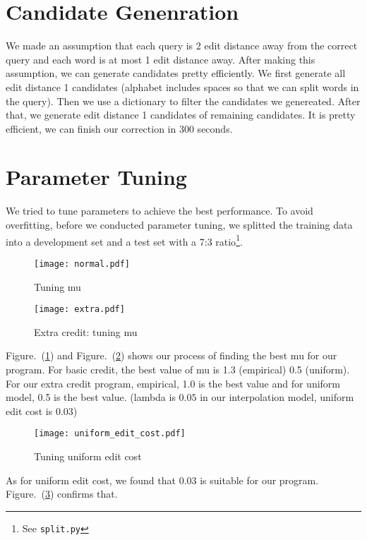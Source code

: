 \documentclass{article}
\begin{document}
\section{Candidate Genenration}

We made an assumption that each query is 2 edit distance away from the correct query and each word is at most 1 edit distance away. After making this assumption, we can generate candidates pretty efficiently. We first generate all edit distance 1 candidates (alphabet includes spaces so that we can split words in the query). Then we use a dictionary to filter the candidates we genereated. After that, we generate edit distance 1 candidates of remaining candidates. It is pretty efficient, we can finish our correction in 300 seconds.

\section{Parameter Tuning}

We tried to tune parameters to achieve the best performance. To avoid overfitting, before we conducted parameter tuning, we splitted the training data into a development set and a test set with a 7:3 ratio\footnote{See \texttt{split.py}}.

\begin{figure}[!htb]
  \centering
  \texttt{[image: normal.pdf]}
  \caption{Tuning mu}
  \label{fig:mu-normal}
\end{figure}

\begin{figure}[!htb]
  \centering
  \texttt{[image: extra.pdf]}
  \caption{Extra credit: tuning mu}
  \label{fig:mu-extra}
\end{figure}

Figure.~(\ref{fig:mu-normal}) and Figure.~(\ref{fig:mu-extra}) shows our process of finding the best mu for our program. For basic credit, the best value of mu is 1.3 (empirical) 0.5 (uniform). For our extra credit program, empirical, 1.0 is the best value and for uniform model, 0.5 is the best value. (lambda is $0.05$ in our interpolation model, uniform edit cost is 0.03)

\begin{figure}[!htb]
  \centering
  \texttt{[image: uniform\_edit\_cost.pdf]}
  \caption{Tuning uniform edit cost}
  \label{fig:uniform-edit-cost}
\end{figure}

As for uniform edit cost, we found that 0.03 is suitable for our program. Figure.~(\ref{fig:uniform-edit-cost}) confirms that.
\end{document}
